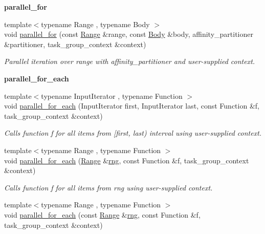 \begin{Indent}{\bf parallel\+\_\+for}
\begin{DoxyCompactItemize}
{\footnotesize template$<$typename Range , typename Body $>$ }\\void \hyperlink{group__algorithms_ga62b1a9ac304ba1eb4f87ab8cc18dd281}{parallel\+\_\+for} (const \hyperlink{classtbb_1_1blocked__range}{Range} \&range, const \hyperlink{classBody}{Body} \&body, affinity\+\_\+partitioner \&partitioner, task\+\_\+group\+\_\+context \&context)
\begin{DoxyCompactList}\small\item\em Parallel iteration over range with affinity\+\_\+partitioner and user-\/supplied context. \end{DoxyCompactList}\end{DoxyCompactItemize}
\end{Indent}
\begin{Indent}{\bf parallel\+\_\+for\+\_\+each}\par
\begin{DoxyCompactItemize}
\item 
{\footnotesize template$<$typename Input\+Iterator , typename Function $>$ }\\void \hyperlink{group__algorithms_ga96bf42caaec779e413e5a2396c1e301c}{parallel\+\_\+for\+\_\+each} (Input\+Iterator first, Input\+Iterator last, const Function \&f, task\+\_\+group\+\_\+context \&context)
\begin{DoxyCompactList}\small\item\em Calls function f for all items from \mbox{[}first, last) interval using user-\/supplied context. \end{DoxyCompactList}\item 
{\footnotesize template$<$typename Range , typename Function $>$ }\\void \hyperlink{group__algorithms_ga72131543fd218b67dbb048b768d534e4}{parallel\+\_\+for\+\_\+each} (\hyperlink{classtbb_1_1blocked__range}{Range} \&\hyperlink{structrng}{rng}, const Function \&f, task\+\_\+group\+\_\+context \&context)
\begin{DoxyCompactList}\small\item\em Calls function f for all items from rng using user-\/supplied context. \end{DoxyCompactList}\item 
{\footnotesize template$<$typename Range , typename Function $>$ }\\void \hyperlink{group__algorithms_gad7d0702d16fbd7554584ab735eed39ba}{parallel\+\_\+for\+\_\+each} (const \hyperlink{classtbb_1_1blocked__range}{Range} \&\hyperlink{structrng}{rng}, const Function \&f, task\+\_\+group\+\_\+context \&context)

\end{DoxyCompactItemize}
\end{Indent}
